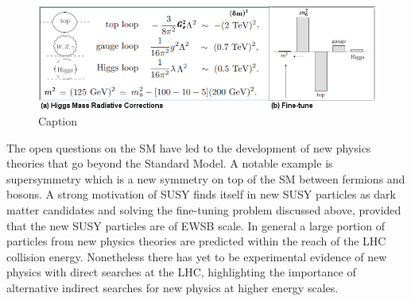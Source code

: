 \begin{figure}[t]
    \includegraphics[width=1.0\textwidth]{Figures/HiggsMass.png}
    \caption{Caption}
    \label{Fig:Higgs Corrections}
\end{figure}
The open questions on the SM have led to the development of new physics theories that go beyond the Standard Model. A notable example is supersymmetry which is a new symmetry on top of the SM between fermions and bosons. A strong motivation of SUSY finds itself in new SUSY particles as dark matter candidates and solving the fine-tuning problem discussed above, provided that the new SUSY particles are of EWSB scale. In general a large portion of particles from new physics theories are predicted within the reach of the LHC collision energy. Nonetheless there has yet to be experimental evidence of new physics with direct searches at the LHC, highlighting the importance of alternative indirect searches for new physics at higher energy scales. 

